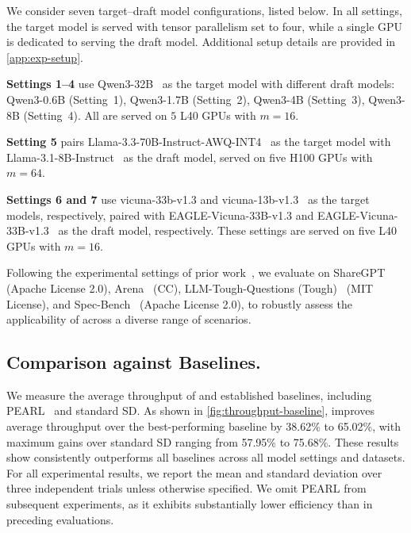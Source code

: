 
We consider seven target–draft model configurations, listed below. In all settings, the target model is served with tensor parallelism set to four, while a single GPU is dedicated to serving the draft model. Additional setup details are provided in \cref{app:exp-setup}.
\squishlisttwo
    \item \textbf{Settings 1--4} use Qwen3-32B~\citep{qwen3technicalreport} as the target model with different draft models: Qwen3-0.6B (Setting~1), Qwen3-1.7B (Setting~2), Qwen3-4B (Setting~3), Qwen3-8B (Setting~4). All are served on $5$ L40 GPUs with $m=16$.
    
    \item \textbf{Setting 5} pairs Llama-3.3-70B-Instruct-AWQ-INT4~\citep{llama3370bawq2024} as the target model with Llama-3.1-8B-Instruct~\citep{grattafiori2024llama3} as the draft model, served on five H100 GPUs with $m=64$.
    
    \item \textbf{Settings 6 and 7} use vicuna-33b-v1.3 and vicuna-13b-v1.3~\citep{zheng2023arena} as the target models, respectively, paired with EAGLE-Vicuna-33B-v1.3 and EAGLE-Vicuna-33B-v1.3~\citep{li2024eagle} as the draft model, respectively. These settings are served on five L40 GPUs with $m=16$.
\squishend


Following the experimental settings of prior work~\citep{hou2025banditspec,oliaro2025suffixdecoding,wu2025tetris}, we evaluate \alg{} on ShareGPT~\citep{sharegpt-dataset} (Apache License 2.0), Arena~\citep{zheng2023arena} (CC), LLM-Tough-Questions (Tough)~\citep{yav-ai2024domain-tough} (MIT License), and Spec-Bench~\citep{xia2024sd-survey} (Apache License 2.0), to robustly assess the applicability of \alg{} across a diverse range of scenarios.


\subsection{Comparison against Baselines.}
\label{subsec:exp-baseline}
We measure the average throughput of \alg{} and established baselines, including PEARL~\citep{liu2025pearl} and standard SD. As shown in \cref{fig:throughput-baseline}, \alg{} improves average throughput over the best-performing baseline by 38.62\% to 65.02\%, with maximum gains over standard SD ranging from 57.95\% to 75.68\%. 
These results show \alg{} consistently outperforms all baselines across all model settings and datasets.
For all experimental results, we report the mean and standard deviation over three independent trials unless otherwise specified.
We omit PEARL from subsequent experiments, as it exhibits substantially lower efficiency than \alg{} in preceding evaluations.


